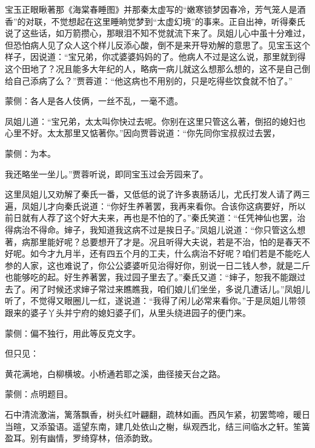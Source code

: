 \begin{parag}
    宝玉正眼瞅著那《海棠春睡图》并那秦太虚写的“嫩寒锁梦因春冷，芳气笼人是酒香”的对联，不觉想起在这里睡晌觉梦到“太虚幻境”的事来。正自出神，听得秦氏说了这些话，如万箭攒心，那眼泪不知不觉就流下来了。凤姐儿心中虽十分难过，但恐怕病人见了众人这个样儿反添心酸，倒不是来开导劝解的意思了。见宝玉这个样子，因说道：“宝兄弟，你忒婆婆妈妈的了。他病人不过是这么说，那里就到得这个田地了？况且能多大年纪的人，略病一病儿就这么想那么想的，这不是自己倒给自己添病了么？”贾蓉道：“他这病也不用别的，只是吃得些饮食就不怕了。”\begin{note}蒙侧：各人是各人伎俩，一丝不乱，一毫不遗。\end{note}凤姐儿道：“宝兄弟，太太叫你快过去呢。你别在这里只管这么著，倒招的媳妇也心里不好。太太那里又惦著你。”因向贾蓉说道：“你先同你宝叔叔过去罢，\begin{note}蒙侧：为本。\end{note}我还略坐一坐儿。”贾蓉听说，即同宝玉过会芳园来了。
\end{parag}


\begin{parag}
    这里凤姐儿又劝解了秦氏一番，又低低的说了许多衷肠话儿，尤氏打发人请了两三遍，凤姐儿才向秦氏说道：“你好生养著罢，我再来看你。合该你这病要好，所以前日就有人荐了这个好大夫来，再也是不怕的了。”秦氏笑道：“任凭神仙也罢，治得病治不得命。婶子，我知道我这病不过是挨日子。”凤姐儿说道：“你只管这么想著，病那里能好呢？总要想开了才是。况且听得大夫说，若是不治，怕的是春天不好呢。如今才九月半，还有四五个月的工夫，什么病治不好呢？咱们若是不能吃人参的人家，这也难说了，你公公婆婆听见治得好你，别说一日二钱人参，就是二斤也能够吃的起。好生养著罢，我过园子里去了。”秦氏又道：“婶子，恕我不能跟过去了。闲了时候还求婶子常过来瞧瞧我，咱们娘儿们坐坐，多说几遭话儿。”凤姐儿听了，不觉得又眼圈儿一红，遂说道：“我得了闲儿必常来看你。”于是凤姐儿带领跟来的婆子丫头并宁府的媳妇婆子们，从里头绕进园子的便门来。\begin{note}蒙侧：偏不独行，用此等反克文字。\end{note}但只见：
\end{parag}


\begin{qute2sp}
    黄花满地，白柳横坡。小桥通若耶之溪，曲径接天台之路。\begin{note}蒙侧：点明题目。\end{note}石中清流激湍，篱落飘香，树头红叶翩翻，疏林如画。西风乍紧，初罢莺啼，暖日当暄，又添蛩语。遥望东南，建几处依山之榭，纵观西北，结三间临水之轩。笙簧盈耳。别有幽情，罗绮穿林，倍添韵致。
\end{qute2sp}


